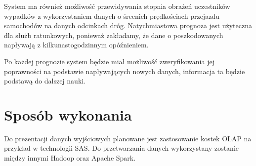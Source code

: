 \documentclass{article}
\begin{document}
System ma również możliwość przewidywania stopnia obrażeń uczestników wypadków z wykorzystaniem danych o śrecnich prędkościach przejazdu samochodów na danych odcinkach dróg. Natychmiastowa prognoza jest użyteczna dla służb ratunkowych, ponieważ zakładamy, że dane o poszkodowanych napływają z kilkunastogodzinnym opóźnieniem.

Po każdej prognozie system będzie miał możliwość zweryfikowania jej poprawności na podstawie napływających nowych danych, informacja ta będzie podstawą do dalszej nauki.


\section{Sposób wykonania}
Do prezentacji danych wyjściowych planowane jest zastosowanie kostek OLAP na przykład w technologii SAS. Do przetwarzania danych wykorzystany zostanie między innymi Hadoop oraz Apache Spark.\\
\end{document}
